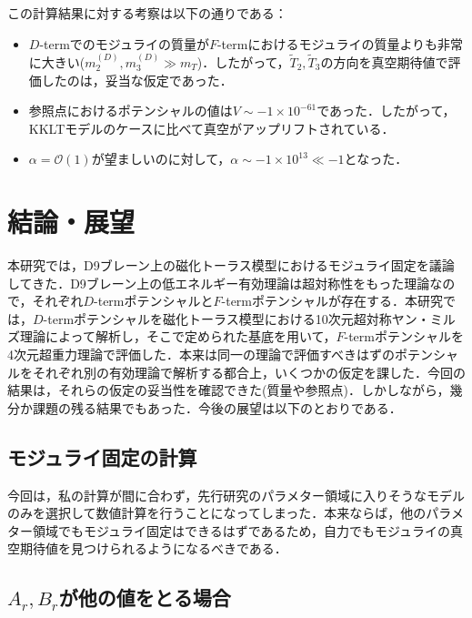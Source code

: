 \documentclass[a4paper,uplatex,dvipdfmx]{jsarticle}
\theoremstyle{definition}
\begin{document}
\vspace*{1cm}

この計算結果に対する考察は以下の通りである：
\begin{itemize}
   \item 
   $D$-termでのモジュライの質量が$F$-termにおけるモジュライの質量よりも非常に大きい($m_{2}^{(D)},m_{3}^{(D)}\gg m_{T}$)．したがって，$\tilde{T}_{2},\tilde{T}_{3}$の方向を真空期待値で評価したのは，妥当な仮定であった．
   \item 
   参照点におけるポテンシャルの値は$V\sim -1\times10^{-61}$であった．したがって，KKLTモデルのケースに比べて真空がアップリフトされている．
   \item 
   $\alpha=\mathcal{O}(1)$が望ましいのに対して，$\alpha\sim -1\times 10^{13}\ll -1$となった．
\end{itemize}

\section{結論・展望}

本研究では，D9ブレーン上の磁化トーラス模型におけるモジュライ固定を議論してきた．D9ブレーン上の低エネルギー有効理論は超対称性をもった理論なので，それぞれ$D$-termポテンシャルと$F$-termポテンシャルが存在する．本研究では，$D$-termポテンシャルを磁化トーラス模型における10次元超対称ヤン・ミルズ理論によって解析し，そこで定められた基底を用いて，$F$-termポテンシャルを4次元超重力理論で評価した．本来は同一の理論で評価すべきはずのポテンシャルをそれぞれ別の有効理論で解析する都合上，いくつかの仮定を課した．今回の結果は，それらの仮定の妥当性を確認できた(質量や参照点)．しかしながら，幾分か課題の残る結果でもあった．今後の展望は以下のとおりである．

\subsection*{モジュライ固定の計算}

今回は，私の計算が間に合わず，先行研究のパラメター領域に入りそうなモデルのみを選択して数値計算を行うことになってしまった．本来ならば，他のパラメター領域でもモジュライ固定はできるはずであるため，自力でもモジュライの真空期待値を見つけられるようになるべきである．

\subsection*{\texorpdfstring{$A_{r},B_{r}$}{Ar,Br}が他の値をとる場合}
\end{document}
